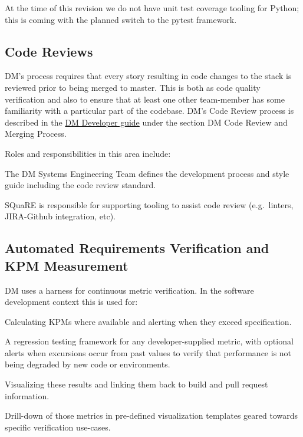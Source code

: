 At the time of this revision we do not have unit test coverage tooling for Python; this is coming with the planned switch to the pytest framework.

\subsection{Code Reviews}

DM’s process requires that every story resulting in code changes to the stack is reviewed prior to being merged to master. This is both as code quality verification and also to ensure that at least one other team-member has some familiarity with a particular part of the codebase. DM’s Code Review process is described in the \href{https://developer.lsst.io}{DM Developer guide} under the section DM Code Review and Merging Process.

Roles and responsibilities in this area include:

\begin{itemize_single}

\item The DM Systems Engineering Team defines the development process and style guide including the code review standard.

\item SQuaRE is responsible for supporting tooling to assist code review (e.g.\ linters, JIRA-Github integration, etc).

\end{itemize_single}

\subsection{Automated Requirements Verification and KPM Measurement}

DM uses a harness for continuous metric verification. In the software development context this is used for:

\begin{itemize_single}

\item Calculating KPMs where available and alerting when they exceed specification.

\item A regression testing framework for any developer-supplied metric, with optional alerts when excursions occur from past values to verify that performance is not being degraded by new code or environments.

\item Visualizing these results and linking them back to build and pull request information.

\item  Drill-down of those metrics in pre-defined visualization templates geared towards specific verification use-cases.

\end{itemize_single}

